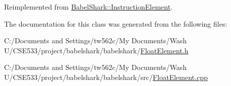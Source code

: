 Reimplemented from \hyperlink{class_babel_shark_1_1_instruction_element_7795ad0b2acedb5a2b68d2c3e63351ae}{BabelShark::InstructionElement}.

The documentation for this class was generated from the following files:\begin{CompactItemize}
\item 
C:/Documents and Settings/tw562c/My Documents/Wash U/CSE533/project/babelshark/babelshark/\hyperlink{_float_element_8h}{FloatElement.h}\item 
C:/Documents and Settings/tw562c/My Documents/Wash U/CSE533/project/babelshark/babelshark/src/\hyperlink{_float_element_8cpp}{FloatElement.cpp}\end{CompactItemize}

